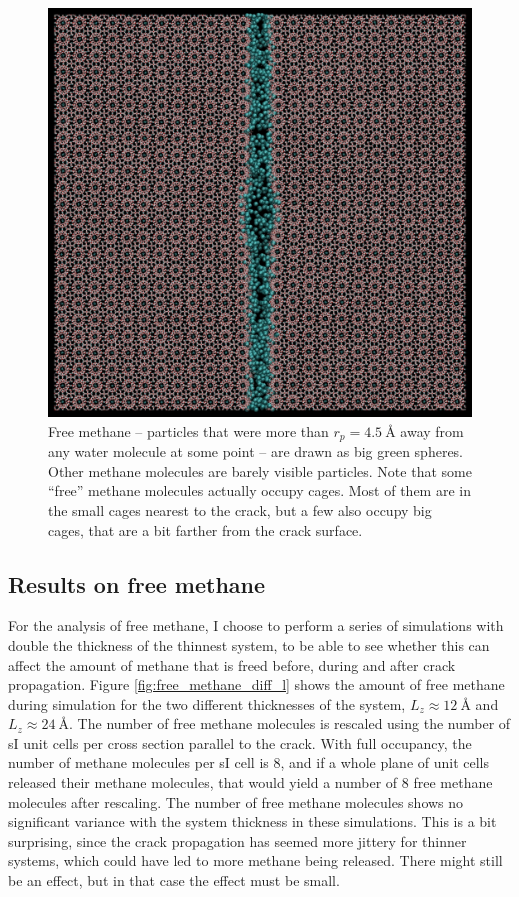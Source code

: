 \begin{figure}
\centering
\includegraphics[width=\textwidth]{../pictures/free_methane.pdf}
\caption{Free methane -- particles that were more than $r_p = \SI{4.5}{\angstrom}$ away from any water molecule at some point -- are drawn as big green spheres. Other methane molecules are barely visible particles. Note that some ``free'' methane molecules actually occupy cages. Most of them are in the small cages nearest to the crack, but a few also occupy big cages, that are a bit farther from the crack surface. }
\label{fig:free_methane}
\end{figure}


\subsection{Results on free methane}
For the analysis of free methane, I choose to perform a series of simulations with double the thickness of the thinnest system, to be able to see whether this can affect the amount of methane that is freed before, during and after crack propagation. Figure \ref{fig:free_methane_diff_l} shows the amount of free methane during simulation for the two different thicknesses of the system, $L_z \approx \SI{12}{\angstrom}$ and $L_z \approx \SI{24}{\angstrom}$. The number of free methane molecules is rescaled using the number of sI unit cells per cross section parallel to the crack. With full occupancy, the number of methane molecules per sI cell is 8, and if a whole plane of unit cells released their methane molecules, that would yield a number of 8 free methane molecules after rescaling. The number of free methane molecules shows no significant variance with the system thickness in these simulations. This is a bit surprising, since the crack propagation has seemed more jittery for thinner systems, which could have led to more methane being released. There might still be an effect, but in that case the effect must be small. 

